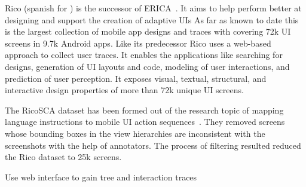 Rico (spanish for ) is the successor of ERICA~\cite{deka2017rico}.
It aims to help perform better at designing and support the creation of adaptive UIs
As far as known to date this is the largest collection of mobile app designs and traces with covering 72k UI screens in 9.7k Android apps.
Like its predecessor Rico uses a web-based approach to collect user traces.
It enables the applications like searching for designs, generation of UI layouts and code, modeling of user interactions, and prediction of user perception.
It exposes visual, textual, structural, and interactive design properties of more than 72k unique UI screens.

The RicoSCA dataset has been formed out of the research topic of mapping language instructions to mobile UI action sequences~\cite{li2020mapping}.
They removed screens whose bounding boxes in the view hierarchies are inconsistent with the screenshots with the help of annotators.
The process of filtering resulted reduced the Rico dataset to 25k screens.

Use web interface to gain tree and interaction traces

